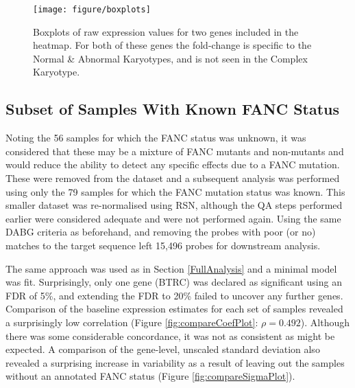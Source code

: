 \documentclass{article}\usepackage{knitr}
\begin{document}
\begin{knitrout}
\color{fgcolor}\begin{figure}[]


{\centering \texttt{[image: figure/boxplots]} 

}

\caption[Boxplots of raw expression values for two genes included in the heatmap]{Boxplots of raw expression values for two genes included in the heatmap. For both of these genes the fold-change is specific to the Normal \& Abnormal Karyotypes, and is not seen in the Complex Karyotype.\label{fig:boxplots}}
\end{figure}


\end{knitrout}



\clearpage
\subsection{Subset of Samples With Known FANC Status}







Noting the 56 samples for which the FANC status was unknown, it was considered that these may be a mixture of FANC mutants and non-mutants and would reduce the ability to detect any specific effects due to a FANC mutation.
These were removed from the dataset and a subsequent analysis was performed using only the 79 samples for which the FANC mutation status was known.
This smaller dataset was re-normalised using RSN, although the QA steps performed earlier were considered adequate and were not performed again.
Using the same DABG criteria as beforehand, and removing the probes with poor (or no) matches to the target sequence left 15,496 probes for downstream analysis.





\par
The same approach was used as in Section \ref{FullAnalysis} and a minimal model was fit.
Surprisingly, only one gene (BTRC) was declared as significant using an FDR of 5\%, and extending the FDR to 20\% failed to uncover any further genes.
Comparison of the baseline expression estimates for each set of samples revealed a surprisingly low correlation (Figure \ref{fig:compareCoefPlot}: $\rho=0.492$).
Although there was some considerable concordance, it was not as consistent as might be expected.
A comparison of the gene-level, unscaled standard deviation also revealed a surprising increase in variability as a result of leaving out the samples without an annotated FANC status (Figure \ref{fig:compareSigmaPlot}).
\end{document}
